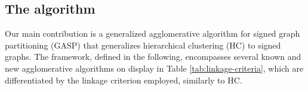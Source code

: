 


\subsection{The \algname{} algorithm} \label{sec:algorithm} 

Our main contribution is a generalized agglomerative algorithm for signed graph partitioning (GASP) that generalizes hierarchical clustering (HC) to signed graphs. 
The framework, defined in the following, encompasses several known and new agglomerative algorithms on display in Table \ref{tab:linkage-criteria}, which are differentiated by the linkage criterion employed, similarly to HC.

